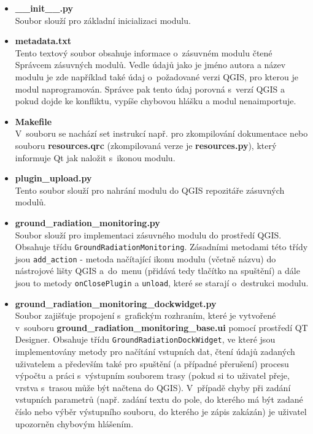 \begin{itemize}
	\item \textbf{\_\_init\_\_.py} \\ Soubor slouží pro základní
inicializaci modulu.
		 
	\item \textbf{metadata.txt} \\ Tento textový soubor obsahuje
informace o~zásuvném modulu čtené Správcem zásuvných modulů. Vedle
údajů jako je jméno autora a název modulu je zde napří\-klad také údaj
o~požadované verzi QGIS, pro kterou je modul naprogramován. Správce
pak tento údaj porovná s~verzí QGIS a pokud dojde ke konfliktu, vypíše
chybovou hlášku a modul nenaimportuje.
	
	\item \textbf{Makefile} \\ V~souboru se nachází set instrukcí
např. pro zkompilování dokumentace nebo souboru \textbf{resources.qrc}
(zkompilovaná verze je \textbf{resources.py}), který informuje Qt jak
naložit s~ikonou modulu.
		
	\item \textbf{plugin\_upload.py} \\ Tento soubor slouží pro
nahrání modulu do QGIS repozitáře zásuvných modulů.

	\item \textbf{ground\_radiation\_monitoring.py} \\ Soubor
slouží pro implementaci zásuvného modulu do prostředí QGIS. Obsahuje
třídu \texttt{GroundRadiationMonitoring}. Zásadními metodami této
třídy jsou \texttt{add\_action} - metoda načítající ikonu modulu
(včetně názvu) do nástrojové lišty QGIS a~do~menu (přidává tedy
tlačítko na spuštění) a dále jsou to metody \texttt{onClosePlugin} a
\texttt{unload}, které se starají o~destrukci modulu.

	\item \textbf{ground\_radiation\_monitoring\_dockwidget.py} \\
Soubor zajišťuje propojení s~grafickým rozhraním, které je vytvořené
v~souboru \textbf{ground\_radiation\_monitoring\_base.ui} pomocí
prostředí QT Designer. Obsahuje třídu
\texttt{GroundRadiationDockWidget}, ve které jsou implementovány metody
pro načítání vstupních dat, čtení údajů zadaných uživatelem a
především také pro spuštění (a případné přerušení) procesu výpočtu a
práci s~výstupním souborem trasy (pokud si to uživatel přeje, vrstva
s~trasou může být načtena do QGIS). V~případě chyby při zadání
vstupních parametrů (např. zadání textu do pole, do kterého má být
zadané číslo nebo výběr výstupního souboru, do kterého je zápis
zakázán) je uživatel upozorněn chybovým hlášením.
	

\end{itemize}

